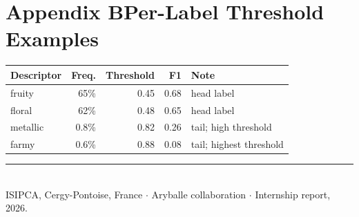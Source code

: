 \documentclass[10pt,twocolumn]{article}
\begin{document}
\section*{Appendix B\quad Per-Label Threshold Examples}
\begin{table}[h]
\centering
\begin{tabular}{lrrrl}
\toprule
\textbf{Descriptor} & \textbf{Freq.} & \textbf{Threshold} & \textbf{F1} & \textbf{Note} \\
\midrule
fruity   & 65\% & 0.45 & 0.68 & head label \\
floral   & 62\% & 0.48 & 0.65 & head label \\
metallic & 0.8\% & 0.82 & 0.26 & tail; high threshold \\
farmy    & 0.6\% & 0.88 & 0.08 & tail; highest threshold \\
\bottomrule
\end{tabular}
\end{table}

\vspace{1em}
\noindent\rule{\textwidth}{0.4pt}\\
\footnotesize ISIPCA, Cergy-Pontoise, France $\cdot$ Aryballe collaboration $\cdot$ Internship report, 2026.
\end{document}
